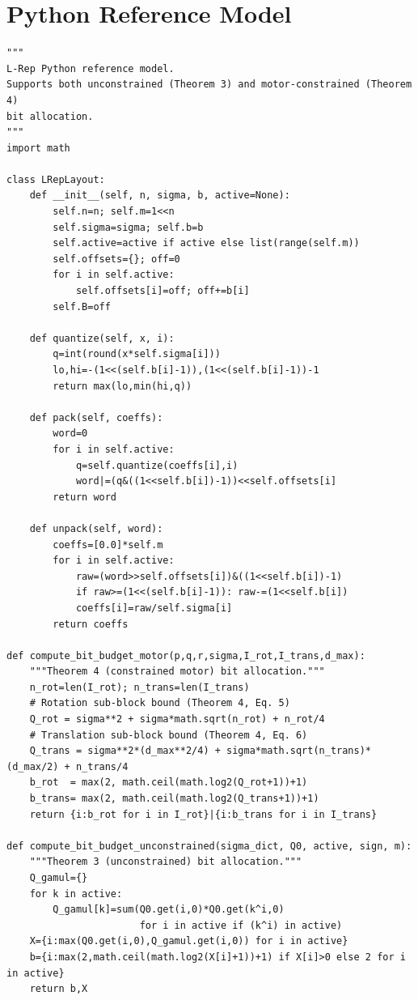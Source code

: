 \documentclass[11pt,a4paper]{article}
\theoremstyle{definition}
\theoremstyle{plain}
\theoremstyle{remark}
\begin{document}
\section{Python Reference Model}
\label{app:sim}

\begin{lstlisting}[caption={Complete Python reference model for L-Rep with motor support},
  label=lst:python]
"""
L-Rep Python reference model.
Supports both unconstrained (Theorem 3) and motor-constrained (Theorem 4)
bit allocation.
"""
import math

class LRepLayout:
    def __init__(self, n, sigma, b, active=None):
        self.n=n; self.m=1<<n
        self.sigma=sigma; self.b=b
        self.active=active if active else list(range(self.m))
        self.offsets={}; off=0
        for i in self.active:
            self.offsets[i]=off; off+=b[i]
        self.B=off

    def quantize(self, x, i):
        q=int(round(x*self.sigma[i]))
        lo,hi=-(1<<(self.b[i]-1)),(1<<(self.b[i]-1))-1
        return max(lo,min(hi,q))

    def pack(self, coeffs):
        word=0
        for i in self.active:
            q=self.quantize(coeffs[i],i)
            word|=(q&((1<<self.b[i])-1))<<self.offsets[i]
        return word

    def unpack(self, word):
        coeffs=[0.0]*self.m
        for i in self.active:
            raw=(word>>self.offsets[i])&((1<<self.b[i])-1)
            if raw>=(1<<(self.b[i]-1)): raw-=(1<<self.b[i])
            coeffs[i]=raw/self.sigma[i]
        return coeffs

def compute_bit_budget_motor(p,q,r,sigma,I_rot,I_trans,d_max):
    """Theorem 4 (constrained motor) bit allocation."""
    n_rot=len(I_rot); n_trans=len(I_trans)
    # Rotation sub-block bound (Theorem 4, Eq. 5)
    Q_rot = sigma**2 + sigma*math.sqrt(n_rot) + n_rot/4
    # Translation sub-block bound (Theorem 4, Eq. 6)
    Q_trans = sigma**2*(d_max**2/4) + sigma*math.sqrt(n_trans)*(d_max/2) + n_trans/4
    b_rot  = max(2, math.ceil(math.log2(Q_rot+1))+1)
    b_trans= max(2, math.ceil(math.log2(Q_trans+1))+1)
    return {i:b_rot for i in I_rot}|{i:b_trans for i in I_trans}

def compute_bit_budget_unconstrained(sigma_dict, Q0, active, sign, m):
    """Theorem 3 (unconstrained) bit allocation."""
    Q_gamul={}
    for k in active:
        Q_gamul[k]=sum(Q0.get(i,0)*Q0.get(k^i,0)
                       for i in active if (k^i) in active)
    X={i:max(Q0.get(i,0),Q_gamul.get(i,0)) for i in active}
    b={i:max(2,math.ceil(math.log2(X[i]+1))+1) if X[i]>0 else 2 for i in active}
    return b,X
\end{lstlisting}
\end{document}
